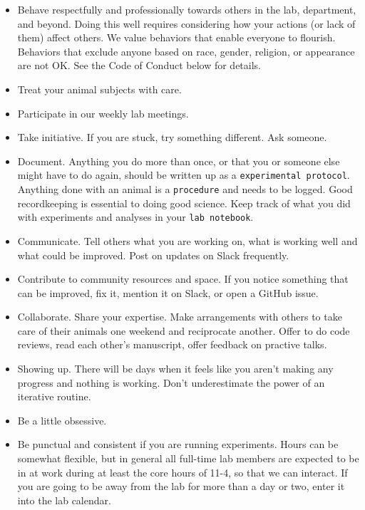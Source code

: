 \documentclass{tufte-book}
\newcommand{\doccls}[1]{\texttt{#1}}%
\begin{document}
\begin{itemize}
\item{Behave respectfully and professionally towards others in the
  lab, department, and beyond. Doing this well requires considering
  how your actions (or lack of them) affect others. We value behaviors that enable everyone to
  flourish. Behaviors that exclude anyone based on race, gender,
  religion, or appearance are not OK. See the Code of Conduct below
  for details.}
\item{Treat your animal subjects with care.}
\item{Participate in our weekly lab meetings.}
\item{Take initiative. If you are stuck, try something different. Ask
  someone.}
\item{Document. Anything you do more than once, or that you or someone
  else might have to do again, should be written up as a
  \doccls{experimental protocol}. Anything done with an animal is a
  \doccls{procedure} and needs to be logged. Good recordkeeping is
  essential to doing good science. Keep track of what you did with
  experiments and analyses in your \doccls{lab notebook}.}
\item{Communicate. Tell others what you are working on, what is
  working well and what could be improved. Post on updates on Slack
  frequently.}
\item{Contribute to community resources and space. If you notice
  something that can be improved, fix it, mention it on Slack, or open
  a GitHub issue.}
\item{Collaborate. Share your expertise. Make arrangements with others
  to take care of their animals one weekend and reciprocate
  another. Offer to do code reviews, read each other's manuscript,
  offer feedback on practive talks.}
\item{Showing up. There will be days when it feels like you aren't
  making any progress and nothing is working. Don't underestimate the
  power of an iterative routine.}
\item{Be a little obsessive.}
\item{Be punctual and consistent if you are running experiments. Hours
  can be somewhat flexible, but in general all full-time lab members
  are expected to be in at work during at least the core hours of
  11-4, so that we can interact. If you are going to be away from the
  lab for more than a day or two, enter it into the lab calendar.}

\end{itemize}
\end{document}
